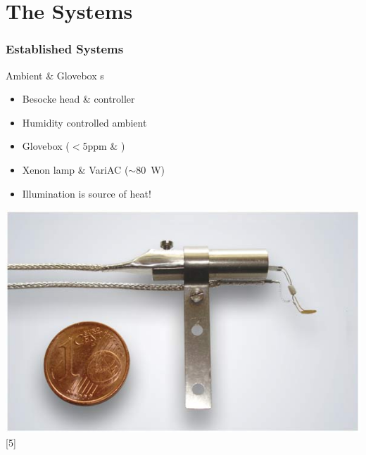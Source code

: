 \documentclass{beamer}
\begin{document}
\section{The Systems}
\begin{frame}
\frametitle{Established \kp{} Systems}
\begin{block}{Ambient \& Glovebox \kp{}s}
\centering
\begin{minipage}{0.55\linewidth}
\centering
\begin{itemize}
	\item Besocke \kp{} head \& controller
	\item Humidity controlled ambient
	\item Glovebox ($<\num{5}$ppm \oxy{} \& \water{})
	\item Xenon lamp \& VariAC ($\sim$\SI{80}{\watt})
	\item Illumination is source of heat!
\end{itemize}
\end{minipage}
\hfill
\begin{minipage}{0.4\linewidth}
\centering
	\includegraphics[width=1\linewidth]{./figs/pres/besocke}\\
	\textcolor{RUred}{[5]}
\end{minipage}
\end{block}\end{frame}
\end{document}
